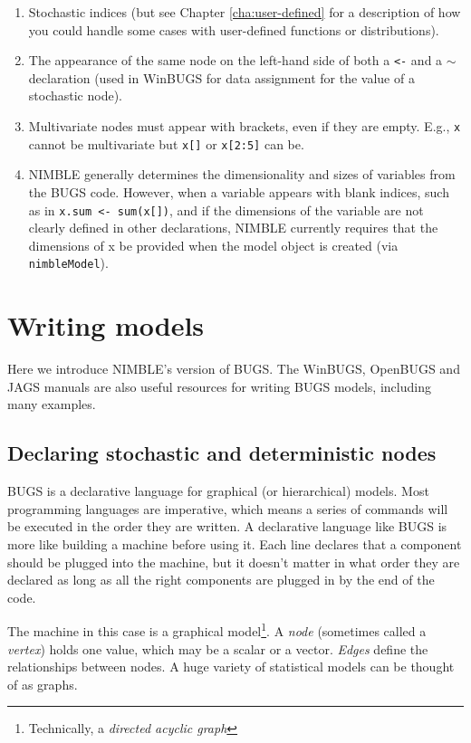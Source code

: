\documentclass[12pt,oneside]{book}\usepackage[]{graphicx}\usepackage[]{color}
\def\cd#1{\texttt{#1}}
\begin{document}
\begin{enumerate}
\item Stochastic indices (but see Chapter \ref{cha:user-defined} for a
  description of how you could handle some cases with user-defined
  functions or distributions).
\item The appearance of the same node on the left-hand side of both a
  \cd{<-} and a \cd{$\sim$} declaration (used in WinBUGS for data
  assignment for the value of a stochastic node).
\item Multivariate nodes must appear with brackets, even if they are
    empty. E.g., \cd{x} cannot be multivariate but \cd{x[]} or
    \cd{x[2:5]} can be.
\item NIMBLE generally determines the dimensionality and
  sizes of variables from the BUGS code.  However, when a variable
  appears with blank indices, such as in \cd{x.sum <- sum(x[])},
  and if the dimensions of the variable are not clearly defined in
  other declarations, NIMBLE currently requires that the dimensions of
  x be provided when the model object is created (via \cd{nimbleModel}).
\end{enumerate}

\section{Writing models}

Here we introduce NIMBLE's version of BUGS.  The WinBUGS, OpenBUGS and
JAGS manuals are also useful resources for writing BUGS models,
including many examples.

\subsection{Declaring stochastic and deterministic nodes}

BUGS is a declarative language for graphical (or hierarchical) models.
Most programming languages are imperative, which means a series of
commands will be executed in the order they are written.  A
declarative language like BUGS is more like building a machine before
using it.  Each line declares that a component should be plugged into
the machine, but it doesn't matter in what order they are declared as
long as all the right components are plugged in by the end of the code.

The machine in this case is a graphical model\footnote{Technically, a
  \textit{directed acyclic graph}}.  A \textit{node} (sometimes called
a \textit{vertex}) holds one value, which may be a scalar or a vector.
\textit{Edges} define the relationships between nodes.  A huge variety
of statistical models can be thought of as graphs.  
\end{document}
